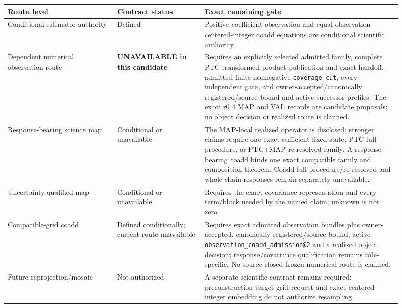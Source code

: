\documentclass[10pt]{article}
\newcommand{\code}[1]{\nolinkurl{#1}}
\begin{document}
\begin{longtable}{L{0.25\linewidth}L{0.20\linewidth}L{0.45\linewidth}}
\toprule
Route level & Contract status & Exact remaining gate\\
\midrule
Conditional estimator authority & Defined & Positive-coefficient observation and equal-observation centered-integer coadd equations are conditional scientific authority.\\
Dependent numerical observation route & \textbf{UNAVAILABLE in this candidate} & Requires an explicitly selected admitted family, complete PTC transformed-product publication and exact handoff, admitted finite-nonnegative \code{coverage\_cut}, every independent gate, and owner-accepted/canonically registered/source-bound and active successor profiles. The exact r0.4 MAP and VAL records are candidate proposals; no object decision or realized route is claimed.\\
Response-bearing science map & Conditional or unavailable & The MAP-local realized operator is disclosed; stronger claims require one exact sufficient fixed-state, PTC full-procedure, or PTC+MAP re-resolved family. A response-bearing coadd binds one exact compatible family and composition theorem. Coadd-full-procedure/re-resolved and whole-chain responses remain separately unavailable.\\
Uncertainty-qualified map & Conditional or unavailable & Requires the exact covariance representation and every term/block needed by the named claim; unknown is not zero.\\
Compatible-grid coadd & Defined conditionally; current route unavailable & Requires exact admitted observation bundles plus owner-accepted, canonically registered/source-bound, active \code{observation\_coadd\_admission@2} and a realized object decision; response/covariance qualification remains role-specific. No source-closed frozen numerical route is claimed.\\
Future reprojection/mosaic & Not authorized & A separate scientific contract remains required; preconstruction target-grid request and exact centered-integer embedding do not authorize resampling.\\
\bottomrule
\end{longtable}
\end{document}
